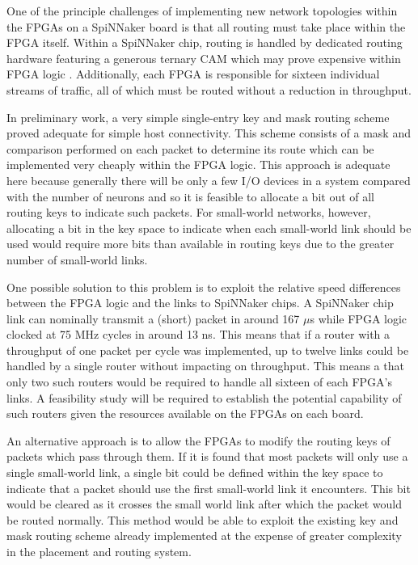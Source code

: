 			One of the principle challenges of implementing new network topologies
			within the FPGAs on a SpiNNaker board is that all routing must take place
			within the FPGA itself. Within a SpiNNaker chip, routing is handled by
			dedicated routing hardware featuring a generous ternary CAM which may
			prove expensive within FPGA logic \cite{locke11}. Additionally, each FPGA is
			responsible for sixteen individual streams of traffic, all of which must
			be routed without a reduction in throughput.
			
			In preliminary work, a very simple single-entry key and mask routing
			scheme proved adequate for simple host connectivity.  This scheme consists
			of a mask and comparison performed on each packet to determine its route
			which can be implemented very cheaply within the FPGA logic.  This
			approach is adequate here because generally there will be only a few I/O
			devices in a system compared with the number of neurons and so it is
			feasible to allocate a bit out of all routing keys to indicate such
			packets.  For small-world networks, however, allocating a bit in the key
			space to indicate when each small-world link should be used would require
			more bits than available in routing keys due to the greater number of
			small-world links.
			
			One possible solution to this problem is to exploit the relative speed
			differences between the FPGA logic and the links to SpiNNaker chips. A
			SpiNNaker chip link can nominally transmit a (short) packet in around 167
			$\mu$s while FPGA logic clocked at 75 MHz cycles in around 13 ns. This
			means that if a router with a throughput of one packet per cycle was
			implemented, up to twelve links could be handled by a single router
			without impacting on throughput. This means a that only two such routers
			would be required to handle all sixteen of each FPGA's links. A
			feasibility study will be required to establish the potential capability
			of such routers given the resources available on the FPGAs on each board.
			
			An alternative approach is to allow the FPGAs to modify the routing keys
			of packets which pass through them. If it is found that most packets will
			only use a single small-world link, a single bit could be defined within
			the key space to indicate that a packet should use the first small-world
			link it encounters. This bit would be cleared as it crosses the small
			world link after which the packet would be routed normally. This method
			would be able to exploit the existing key and mask routing scheme already
			implemented at the expense of greater complexity in the placement and
			routing system.
			
